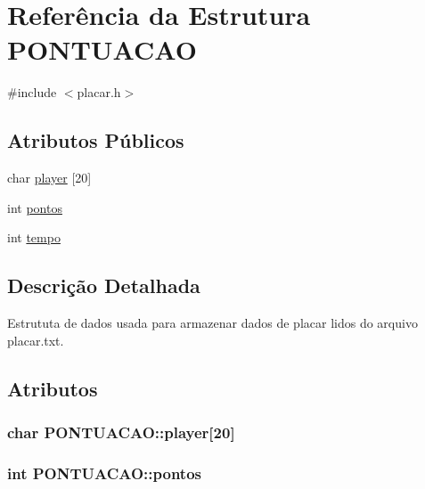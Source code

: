 \hypertarget{structPONTUACAO}{}\section{Referência da Estrutura P\+O\+N\+T\+U\+A\+C\+A\+O}
\label{structPONTUACAO}


{\ttfamily \#include $<$placar.\+h$>$}

\subsection*{Atributos Públicos}
\begin{DoxyCompactItemize}
\item 
char \hyperlink{structPONTUACAO_a0f853ffda20a3e76687d2d1b9d7d1cf6}{player} \mbox{[}20\mbox{]}
\item 
int \hyperlink{structPONTUACAO_a773ef71e188a3e55bf7d0bdafa54afdb}{pontos}
\item 
int \hyperlink{structPONTUACAO_ae90e645ea891d3dff0d43b9a191b4d89}{tempo}
\end{DoxyCompactItemize}


\subsection{Descrição Detalhada}
Estrututa de dados usada para armazenar dados de placar lidos do arquivo placar.\+txt. 

\subsection{Atributos}
\hypertarget{structPONTUACAO_a0f853ffda20a3e76687d2d1b9d7d1cf6}{}
\subsubsection[{player}]{\setlength{\rightskip}{0pt plus 5cm}char P\+O\+N\+T\+U\+A\+C\+A\+O\+::player\mbox{[}20\mbox{]}}\label{structPONTUACAO_a0f853ffda20a3e76687d2d1b9d7d1cf6}
\hypertarget{structPONTUACAO_a773ef71e188a3e55bf7d0bdafa54afdb}{}
\subsubsection[{pontos}]{\setlength{\rightskip}{0pt plus 5cm}int P\+O\+N\+T\+U\+A\+C\+A\+O\+::pontos}\label{structPONTUACAO_a773ef71e188a3e55bf7d0bdafa54afdb}
\hypertarget{structPONTUACAO_ae90e645ea891d3dff0d43b9a191b4d89}{}

